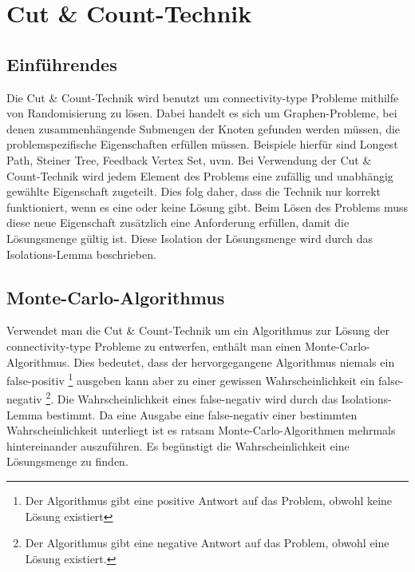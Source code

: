 %
%
%
\chapter{Cut \& Count-Technik}
\label{c:cc_general} %


\section{Einführendes}
\label{sec:cc_intro}
Die Cut \& Count-Technik wird benutzt um connectivity-type Probleme mithilfe von Randomisierung zu lösen. Dabei handelt es sich um Graphen-Probleme, bei denen zusammenhängende Submengen der Knoten gefunden werden müssen, die problemspezifische  Eigenschaften erfüllen müssen. Beispiele hierfür sind Longest Path, Steiner Tree, Feedback Vertex Set, uvm.
Bei Verwendung der Cut \& Count-Technik wird jedem Element des Problems eine zufällig und unabhängig gewählte Eigenschaft zugeteilt. Dies folg daher, dass die Technik nur korrekt funktioniert, wenn es eine oder keine Lösung gibt. Beim Lösen des Problems muss diese neue Eigenschaft zusätzlich eine Anforderung erfüllen, damit die Lösungsmenge gültig ist. Diese Isolation der Lösungsmenge wird durch das Isolations-Lemma beschrieben.

\section{Monte-Carlo-Algorithmus}
\label{sec:cc_monte}

Verwendet man die Cut \& Count-Technik um ein Algorithmus zur Lösung der connectivity-type Probleme zu entwerfen, enthält man einen Monte-Carlo-Algorithmus. Dies bedeutet, dass der hervorgegangene Algorithmus niemals ein false-positiv \footnote{Der Algorithmus gibt eine positive Antwort auf das Problem, obwohl keine Lösung existiert} ausgeben kann aber zu einer gewissen Wahrscheinlichkeit ein false-negativ \footnote{Der Algorithmus gibt eine negative Antwort auf das Problem, obwohl eine Lösung existiert.}. Die Wahrscheinlichkeit eines false-negativ wird durch das Isolations-Lemma bestimmt. Da eine Ausgabe eine false-negativ einer bestimmten Wahrscheinlichkeit unterliegt ist es ratsam Monte-Carlo-Algorithmen mehrmals hintereinander auszuführen. Es begünstigt die Wahrscheinlichkeit eine Lösungsmenge zu finden.

